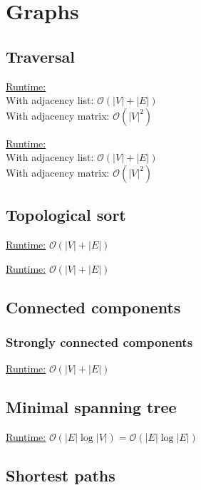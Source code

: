 \section{Graphs}
\subsection{Traversal}

\underline{Runtime:}\\
With adjacency list: $\mathcal{O}(\lvert V \rvert + \lvert E \rvert)$ \\
With adjacency matrix: $\mathcal{O}(\lvert V \rvert^2)$

\underline{Runtime:}\\
With adjacency list: $\mathcal{O}(\lvert V \rvert + \lvert E \rvert)$ \\
With adjacency matrix: $\mathcal{O}(\lvert V \rvert^2)$


\subsection{Topological sort}

\underline{Runtime:} $\mathcal{O}(\lvert V \rvert + \lvert E \rvert)$

\underline{Runtime:} $\mathcal{O}(\lvert V \rvert + \lvert E \rvert)$


\subsection{Connected components}

\subsubsection{Strongly connected components}
\underline{Runtime:} $\mathcal{O}(\lvert V \rvert + \lvert E \rvert)$



\subsection{Minimal spanning tree}
\underline{Runtime:} $\mathcal{O}(\lvert E \rvert \log \lvert V
\rvert) = \mathcal{O}(\lvert E \rvert \log \lvert E \rvert)$


\subsection{Shortest paths}

